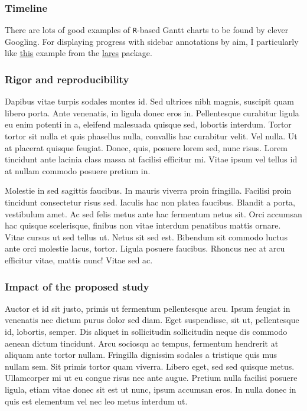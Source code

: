\documentclass[11pt,]{article}
\begin{document}
\hypertarget{timeline}{%
\subsubsection{Timeline}\label{timeline}}

There are lots of good examples of \texttt{R}-based Gantt charts to be
found by clever Googling. For displaying progress with sidebar
annotations by aim, I particularly like
\href{https://datascienceplus.com/visualize-your-cvs-timeline-with-r-gantt-style/}{\underline{this}}
example from the
\href{https://github.com/laresbernardo/lares}{\underline{lares}}
package.

\hypertarget{rigor-and-reproducibility}{%
\subsubsection{Rigor and
reproducibility}\label{rigor-and-reproducibility}}

Dapibus vitae turpis sodales montes id. Sed ultrices nibh magnis,
suscipit quam libero porta. Ante venenatis, in ligula donec eros in.
Pellentesque curabitur ligula eu enim potenti in a, eleifend malesuada
quisque sed, lobortis interdum. Tortor tortor sit nulla et quis
phasellus nulla, convallis hac curabitur velit. Vel nulla. Ut at
placerat quisque feugiat. Donec, quis, posuere lorem sed, nunc risus.
Lorem tincidunt ante lacinia class massa at facilisi efficitur mi. Vitae
ipsum vel tellus id at nullam commodo posuere pretium in.

Molestie in sed sagittis faucibus. In mauris viverra proin fringilla.
Facilisi proin tincidunt consectetur risus sed. Iaculis hac non platea
faucibus. Blandit a porta, vestibulum amet. Ac sed felis metus ante hac
fermentum netus sit. Orci accumsan hac quisque scelerisque, finibus non
vitae interdum penatibus mattis ornare. Vitae cursus ut sed tellus ut.
Netus sit sed est. Bibendum sit commodo luctus ante orci molestie lacus,
tortor. Ligula posuere faucibus. Rhoncus nec at arcu efficitur vitae,
mattis nunc! Vitae sed ac.

\hypertarget{impact-of-the-proposed-study}{%
\subsubsection{Impact of the proposed
study}\label{impact-of-the-proposed-study}}

Auctor et id sit justo, primis ut fermentum pellentesque arcu. Ipsum
feugiat in venenatis nec dictum purus dolor sed diam. Eget suspendisse,
sit ut, pellentesque id, lobortis, semper. Dis aliquet in sollicitudin
sollicitudin neque dis commodo aenean dictum tincidunt. Arcu sociosqu ac
tempus, fermentum hendrerit at aliquam ante tortor nullam. Fringilla
dignissim sodales a tristique quis mus nullam sem. Sit primis tortor
quam viverra. Libero eget, sed sed quisque metus. Ullamcorper mi ut eu
congue risus nec ante augue. Pretium nulla facilisi posuere ligula,
etiam vitae donec sit est ut nunc, ipsum accumsan eros. In nulla donec
in quis est elementum vel nec leo metus interdum ut.


\end{document}
